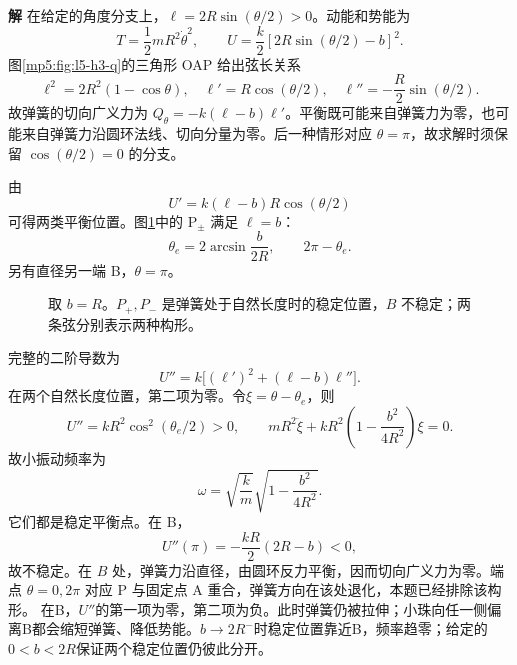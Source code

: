 \documentclass[11pt,openany,fontset=fandol]{ctexbook}
\theoremstyle{definition}\newtheorem{example}{例}[chapter]\newtheorem{exercise}{习题}[chapter]
\newcommand{\SolutionStart}{\par\medskip\ifdim\pagetotal>0pt\ifdim\dimexpr\pagegoal-\pagetotal\relax<3\baselineskip\newpage\fi\fi\noindent\textbf{解}\quad\ignorespaces}
\newenvironment{solution}{\SolutionStart}{\par\medskip}
\begin{document}
\begin{solution}
在给定的角度分支上，$\ell=2R\sin(\theta/2)>0$。动能和势能为
\[
T=\frac12mR^2\dot\theta^2,
\qquad U=\frac k2[2R\sin(\theta/2)-b]^2.
\]
图\ref{mp5:fig:l5-h3-q}的三角形 OAP 给出弦长关系
\[
\ell^2=2R^2(1-\cos\theta),\quad
\ell'=R\cos(\theta/2),\quad
\ell''=-\frac R2\sin(\theta/2).
\]
故弹簧的切向广义力为 $Q_\theta=-k(\ell-b)\ell'$。平衡既可能来自弹簧力为零，也可能来自弹簧力沿圆环法线、切向分量为零。后一种情形对应 $\theta=\pi$，故求解时须保留 $\cos(\theta/2)=0$ 的分支。

由
\[
U'=k(\ell-b)R\cos(\theta/2)
\]
可得两类平衡位置。图\ref{mp5:fig:l5-h3-s}中的 P$_\pm$ 满足 $\ell=b$：
\[
\theta_e=2\arcsin\frac b{2R},\qquad 2\pi-\theta_e.
\]
另有直径另一端 B，$\theta=\pi$。

\begin{figure}[H]\centering
{}
\caption{取 $b=R$。$P_+,P_-$ 是弹簧处于自然长度时的稳定位置，$B$ 不稳定；两条弦分别表示两种构形。}\label{mp5:fig:l5-h3-s}
\end{figure}

完整的二阶导数为
\[
U''=k\big[(\ell')^2+(\ell-b)\ell''\big].
\]
在两个自然长度位置，第二项为零。令$\xi=\theta-\theta_e$，则
\[
U''=kR^2\cos^2(\theta_e/2)>0,
\qquad mR^2\ddot\xi+kR^2\left(1-\frac{b^2}{4R^2}\right)\xi=0.
\]
故小振动频率为
\[
\boxed{\omega=\sqrt{\frac km}\sqrt{1-\frac{b^2}{4R^2}}.}
\]
它们都是稳定平衡点。在 B，
\[
U''(\pi)=-\frac{kR}{2}(2R-b)<0,
\]
故不稳定。在 $B$ 处，弹簧力沿直径，由圆环反力平衡，因而切向广义力为零。端点 $\theta=0,2\pi$ 对应 P 与固定点 A 重合，弹簧方向在该处退化，本题已经排除该构形。
在B，$U''$的第一项为零，第二项为负。此时弹簧仍被拉伸；小珠向任一侧偏离B都会缩短弹簧、降低势能。$b\to2R^-$时稳定位置靠近B，频率趋零；给定的$0<b<2R$保证两个稳定位置仍彼此分开。

\end{solution}
\end{document}
